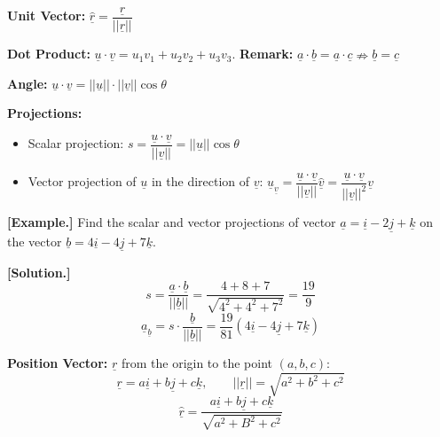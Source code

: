 \documentclass[11pt, a4paper]{MATH2023}
\newcommand{\eg}{\textbf{[Example.] }}
\newcommand{\sol}{\textbf{[Solution.] }}
\newcommand{\vct}{\underline}
\newcommand{\vv}{\underline{v}}
\newcommand{\uu}{\underline{u}}
\newcommand{\rr}{\underline{r}}
\newcommand{\ii}{\underline{i}}
\newcommand{\kk}{\underline{k}}
\newcommand{\jj}{\underline{j}}
\newcommand{\va}{\underline{a}}
\newcommand{\bb}{\underline{b}}
\begin{document}
\begin{spacing}{1.3}
    {\bf Unit Vector:} $\hat{\vct{r}}=\dfrac{\vct{r}}{||\vct{r}||}$

    {\bf Dot Product:} $\vct{u}\cdot \vct{v}=u_1v_1+u_2v_2+u_3v_3$.
    {\bf Remark: } $\vct{a}\cdot \vct{b}=\vct{a}\cdot \vct{c} \nRightarrow \vct{b}=\vct{c}$

    {\bf Angle:} $\vct{u}\cdot \vct{v}=||\vct{u}||\cdot ||\vct{v}||\cos\theta$

    {\bf Projections:}
    \begin{itemize}
        \item Scalar projection: $s=\dfrac{\vct{u}\cdot \vct{v}}{||\vct{v}||}=
        ||\vct{u}||\cos \theta$
        \item Vector projection of $\vct{u}$ in the direction of $\vct{v}$: 
        $\vct{u}_{\vct{v}}=\dfrac{\uu\cdot \vv}{||\vv||}\hat{\vv}=
        \dfrac{\uu\cdot \vv}{||\vv||^2}\vv$
    \end{itemize}

    \eg Find the scalar and vector projections of vector $\va=\ii-2\jj+\kk$ on
    the vector $\bb=4\ii-4\jj+7\kk$.

    \sol $$s=\frac{\va\cdot \bb}{||\bb||}=\frac{4+8+7}{\sqrt{4^2+4^2+7^2}}=\frac{19}{9}$$
    $$\va_{\bb}=s\cdot \frac{\bb}{||\bb||}=\frac{19}{81}(4\ii-4\jj+7\kk)$$

    {\bf Position Vector:} $\rr$ from the origin to the point $(a,b,c)$: 
    $$\rr = a\ii+b\jj+c\kk,\qquad ||\rr||=\sqrt{a^2+b^2+c^2}$$
    $$\hat{\rr}=\frac{a\ii+b\jj+c\kk}{\sqrt{a^2+B^2+c^2}}$$


\end{spacing}
\end{document}
